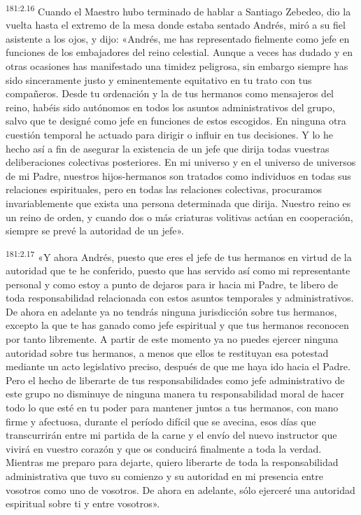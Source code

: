 \par 
\textsuperscript{181:2.16} Cuando el Maestro hubo terminado de hablar a Santiago Zebedeo, dio la vuelta hasta el extremo de la mesa donde estaba sentado Andrés, miró a su fiel asistente a los ojos, y dijo: «Andrés, me has representado fielmente como jefe en funciones de los embajadores del reino celestial. Aunque a veces has dudado y en otras ocasiones has manifestado una timidez peligrosa, sin embargo siempre has sido sinceramente justo y eminentemente equitativo en tu trato con tus compañeros. Desde tu ordenación y la de tus hermanos como mensajeros del reino, habéis sido autónomos en todos los asuntos administrativos del grupo, salvo que te designé como jefe en funciones de estos escogidos. En ninguna otra cuestión temporal he actuado para dirigir o influir en tus decisiones. Y lo he hecho así a fin de asegurar la existencia de un jefe que dirija todas vuestras deliberaciones colectivas posteriores. En mi universo y en el universo de universos de mi Padre, nuestros hijos-hermanos son tratados como individuos en todas sus relaciones espirituales, pero en todas las relaciones colectivas, procuramos invariablemente que exista una persona determinada que dirija. Nuestro reino es un reino de orden, y cuando dos o más criaturas volitivas actúan en cooperación, siempre se prevé la autoridad de un jefe».

\par 
\textsuperscript{181:2.17} «Y ahora Andrés, puesto que eres el jefe de tus hermanos en virtud de la autoridad que te he conferido, puesto que has servido así como mi representante personal y como estoy a punto de dejaros para ir hacia mi Padre, te libero de toda responsabilidad relacionada con estos asuntos temporales y administrativos. De ahora en adelante ya no tendrás ninguna jurisdicción sobre tus hermanos, excepto la que te has ganado como jefe espiritual y que tus hermanos reconocen por tanto libremente. A partir de este momento ya no puedes ejercer ninguna autoridad sobre tus hermanos, a menos que ellos te restituyan esa potestad mediante un acto legislativo preciso, después de que me haya ido hacia el Padre. Pero el hecho de liberarte de tus responsabilidades como jefe administrativo de este grupo no disminuye de ninguna manera tu responsabilidad moral de hacer todo lo que esté en tu poder para mantener juntos a tus hermanos, con mano firme y afectuosa, durante el período difícil que se avecina, esos días que transcurrirán entre mi partida de la carne y el envío del nuevo instructor que vivirá en vuestro corazón y que os conducirá finalmente a toda la verdad. Mientras me preparo para dejarte, quiero liberarte de toda la responsabilidad administrativa que tuvo su comienzo y su autoridad en mi presencia entre vosotros como uno de vosotros. De ahora en adelante, sólo ejerceré una autoridad espiritual sobre ti y entre vosotros».


